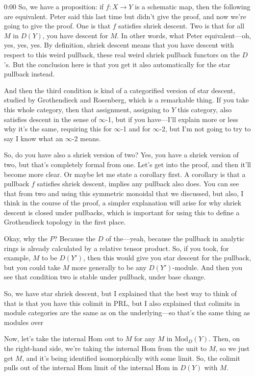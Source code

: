 \begin{unfinished}{0:00}
So, we have a proposition: if $f: X \to Y$ is a schematic map, then the following are equivalent. Peter said this last time but didn't give the proof, and now we're going to give the proof. One is that $f$ satisfies shriek descent. Two is that for all $M$ in $D(Y)$, you have descent for $M$. In other words, what Peter equivalent---oh, yes, yes, yes. By definition, shriek descent means that you have descent with respect to this weird pullback, these real weird shriek pullback functors on the $D$'s. But the conclusion here is that you get it also automatically for the star pullback instead.

And then the third condition is kind of a categorified version of star descent, studied by Grothendieck and Rosenberg, which is a remarkable thing. If you take this whole category, then that assignment, assigning to $Y$ this category, also satisfies descent in the sense of $\infty$-1, but if you have---I'll explain more or less why it's the same, requiring this for $\infty$-1 and for $\infty$-2, but I'm not going to try to say I know what an $\infty$-2 means.

So, do you have also a shriek version of two? Yes, you have a shriek version of two, but that's completely formal from one. Let's get into the proof, and then it'll become more clear. Or maybe let me state a corollary first. A corollary is that a pullback $f$ satisfies shriek descent, implies any pullback also does. You can see that from two and using this symmetric monoidal that we discussed, but also, I think in the course of the proof, a simpler explanation will arise for why shriek descent is closed under pullbacks, which is important for using this to define a Grothendieck topology in the first place.

Okay, why the $P$? Because the $D$ of the---yeah, because the pullback in analytic rings is already calculated by a relative tensor product. So, if you took, for example, $M$ to be $D(Y')$, then this would give you star descent for the pullback, but you could take $M$ more generally to be any $D(Y')$-module. And then you see that condition two is stable under pullback, under base change.

So, we have star shriek descent, but I explained that the best way to think of that is that you have this colimit in $\mathrm{PRL}$, but I also explained that colimits in module categories are the same as on the underlying---so that's the same thing as modules over

Now, let's take the internal Hom out to $M$ for any $M$ in $\mathrm{Mod}_D(Y)$. Then, on the right-hand side, we're taking the internal Hom from the unit to $M$, so we just get $M$, and it's being identified isomorphically with some limit. So, the colimit pulls out of the internal Hom limit of the internal Hom in $D(Y)$ with $M$.


\end{unfinished}
